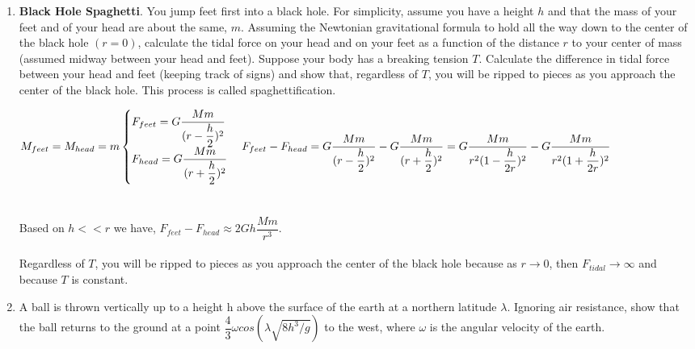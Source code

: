 \documentclass[fleqn]{article}
\begin{document}
\begin{enumerate}
    \item \textbf{Black Hole Spaghetti}. You jump feet first into a black hole. For simplicity, assume you have
    a height $h$ and that the mass of your feet and of your head are about the same, $m$. Assuming the Newtonian gravitational formula to hold
    all the way down to the center of the black hole $(r = 0)$, calculate the tidal force on your head and on your feet as a function of the distance $r$
    to your center of mass (assumed midway between your head and feet). Suppose your body has a breaking tension $T$. Calculate the difference
    in tidal force between your head and feet (keeping track of signs) and show that, regardless of $T$, you will be ripped to pieces as you approach
    the center of the black hole. This process is called spaghettification.

      \textcolor{hwColor}{
        $
          M_{feet}=M_{head}=m \\
          \\
          \begin{cases}
            F_{feet}=G \dfrac{M m}{(r-\dfrac{h}{2})^2}
            \\
            F_{head}=G \dfrac{M m}{(r+\dfrac{h}{2})^2}
          \end{cases}
          \\
          \\
          F_{feet}-F_{head}=G \dfrac{M m}{(r-\dfrac{h}{2})^2}-G \dfrac{M m}{(r+\dfrac{h}{2})^2}
          \\
          \\
          \\
          =G \dfrac{M m}{r^2(1-\dfrac{h}{2r})^2}-G \dfrac{M m}{r^2(1+\dfrac{h}{2r})^2}
        $
        \\
        \\
        \\
        Based on $h<<r$ we have, $F_{feet}-F_{head} \approx 2Gh \dfrac{Mm}{r^3}$. 
        \\
        \\
        Regardless of $T$, you will be ripped to pieces as you approach the center of the black hole because
        as $r \to 0$, then $F_{tidal} \to \infty$ and because $T$ is constant.
      }

    \item A ball is thrown vertically up to a height h above the surface of the earth at a northern latitude $\lambda$. Ignoring air resistance, show that the
    ball returns to the ground at a point $\dfrac{4}{3} \omega cos(\lambda \sqrt{8h^3/g})$ to the west, where $\omega$ is the angular velocity of the earth.


\end{enumerate}
\end{document}
